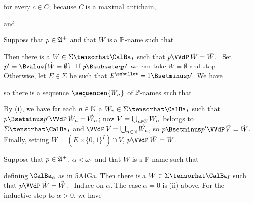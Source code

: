 {

\noindent for every $c\in C$;  because $C$ is a maximal antichain,


\noindent and


\medskip

 Suppose that $p\in\frak A^+$ and that $\dot W$ is a
$\Bbb P$-name such that


\noindent Then there is a $W\in\Sigma\tensorhat\CalBa_I$ such that
$p\VVdP\,\dot W=\vec W$.   \Prf\ Set $p'=\Bvalue{\dot W=\emptyset}$.
If $p\Bsubseteq p'$ we can take $W=\emptyset$ and stop.   Otherwise,
let $E\in\Sigma$ be such that $E^{\ssbullet}=1\Bsetminus p'$.   We have


\noindent so there is a sequence $\sequencen{\dot W_n}$ of $\Bbb P$-names
such that


\noindent By (i), we have for each $n\in\Bbb N$ a
$W_n\in\Sigma\tensorhat\CalBa_I$ such that
$p\Bsetminus p'\VVdP\,\dot W_n=\vec W_n$;
now $V=\bigcup_{n\in\Bbb N}W_n$ belongs to
$\Sigma\tensorhat\CalBa_I$ and
$\VVdP\,\vec V=\bigcup_{n\in\Bbb N}\vec W_n$, so
$p\Bsetminus p'\VVdP\,\vec V=\dot W$.   Finally, setting
$W=(E\times\{0,1\}^I)\cap V$, $p\VVdP\,\vec W=\dot W$.\ \Qed

\medskip

 Suppose that $p\in\frak A^+$, $\alpha<\omega_1$ and that
$\dot W$ is a $\Bbb P$-name such that


\noindent defining $\CalBa_{\alpha}$ as in 5A4Ga.
Then there is a $W\in\Sigma\tensorhat\CalBa_I$ such that
$p\VVdP\,\dot W=\vec W$.   \Prf\ Induce on $\alpha$.   The case $\alpha=0$
is (ii) above.   For the inductive step to $\alpha>0$, we have


}
